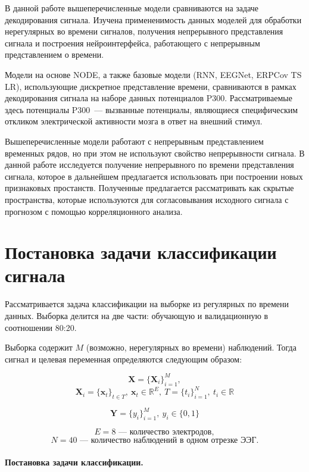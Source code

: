 \documentclass{article}
\newcommand{\x}{\mathbf{x}}
\newcommand{\Y}{\mathbf{Y}}
\newcommand{\X}{\mathbf{X}}
\newcommand{\R}{\mathbb{R}}
\begin{document}
В данной работе вышеперечисленные модели сравниваются на задаче декодирования сигнала. Изучена примененимость данных моделей для обработки нерегулярных во времени сигналов, получения непрерывного представления сигнала и построения нейроинтерфейса, работающего с непрерывным представлением о времени.

Модели на основе NODE, а также базовые модели (RNN, EEGNet\cite{Lawhern2018EEGNetAC}, ERPCov TS LR\cite{6046114}), использующие дискретное представление времени, сравниваются в рамках декодирования сигнала на наборе данных потенциалов P300. Рассматриваемые здесь потенциалы P300~--- вызванные потенциалы, являющиеся специфическим откликом электрической активности мозга в ответ на внешний стимул.

Вышеперечисленные модели работают с непрерывным представлением временных рядов, но при этом не используют свойство непрерывности сигнала. В данной работе исследуется получение непрерывного по времени представления сигнала, которое в дальнейшем предлагается использовать при построении новых признаковых простанств. Полученные предлагается рассматривать как скрытые пространства, которые используются для согласовывания исходного сигнала с прогнозом с помощью корреляционного анализа.

\section{Постановка задачи классификации сигнала}


    
    Рассматривается задача классификации на выборке из регулярных по времени данных. Выборка делится на две части: обучающую и валидационную в соотношении 80:20.
    
    Выборка содержит $M$ (возможно, нерегулярных во времени) наблюдений. Тогда сигнал и целевая переменная определяются следующим образом:
    

    $$\X = \{\X_i\}_{i=1}^{M},$$
    $$\X_i = \{\x_t\}_{t\in T}, \ \x_t \in \R^E, \ T = \{t_i\}_{i=1}^{N},\ t_i \in \R$$ 
    
    $$\Y = \{y_i\}_{i=1}^{M},\ y_i \in \{0, 1\}$$
    
    $$E = 8 \text{~--- количество электродов},$$
    $$N = 40 \text{~--- количество наблюдений в одном отрезке ЭЭГ}.$$

    \paragraph{Постановка задачи классификации.}
    
\end{document}

